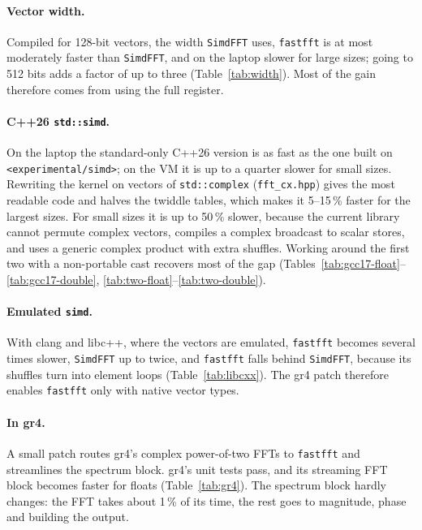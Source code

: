 \documentclass[10pt,a4paper,twocolumn]{article}
\newcommand{\code}[1]{\texttt{#1}}
\begin{document}
\paragraph{Vector width.} Compiled for 128-bit vectors, the width \code{SimdFFT} uses, \code{fastfft} is at most
moderately faster than \code{SimdFFT}, and on the laptop slower for large sizes; going to 512 bits adds a factor of up
to three (Table~\ref{tab:width}). Most of the gain
therefore comes from using the full register.

\paragraph{C++26 \texttt{std::simd}.} On the laptop the standard-only C++26 version is as fast as the one built on
\code{<experimental/simd>}; on the VM it is up to a quarter slower for small sizes. Rewriting the kernel on vectors of
\code{std::complex} (\code{fft\_cx.hpp}) gives the most readable code and halves the twiddle tables, which makes it
5--15\,\% faster for the largest sizes. For small sizes it is up to 50\,\% slower, because the current library cannot
permute complex vectors, compiles a complex broadcast to scalar stores, and uses a generic complex product with extra
shuffles. Working around the first two with a non-portable cast recovers most of the gap
(Tables~\ref{tab:gcc17-float}--\ref{tab:gcc17-double}, \ref{tab:two-float}--\ref{tab:two-double}).

\paragraph{Emulated \texttt{simd}.} With clang and libc++, where the vectors are emulated, \code{fastfft} becomes several
times slower, \code{SimdFFT} up to twice, and \code{fastfft} falls behind \code{SimdFFT}, because its shuffles turn into element loops
(Table~\ref{tab:libcxx}). The gr4 patch therefore enables \code{fastfft} only with native vector types.

\paragraph{In gr4.} A small patch routes gr4's complex power-of-two FFTs to \code{fastfft} and streamlines the spectrum
block. gr4's unit tests pass, and its streaming FFT block becomes \GrStreamFloat{} faster for floats
(Table~\ref{tab:gr4}). The spectrum block hardly changes: the FFT takes about 1\,\% of its time, the rest goes to
magnitude, phase and building the output.
\end{document}
